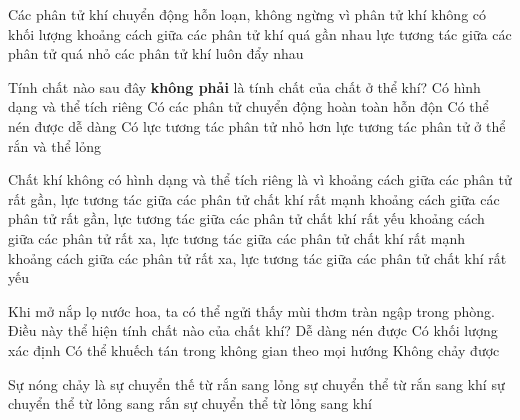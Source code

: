 \begin{ex} 
Các phân tử khí chuyển động hỗn loạn, không ngừng vì
\choice
{ phân tử khí không có khối lượng}
{ khoảng cách giữa các phân tử khí quá gần nhau}
{\True lực tương tác giữa các phân tử quá nhỏ}
{ các phân tử khí luôn đẩy nhau}
\end{ex}


\begin{ex}
Tính chất nào sau đây \textbf{không phải} là tính chất của chất ở thể khí?
\choice
{\True Có hình dạng và thể tích riêng}
{ Có các phân tử chuyển động hoàn toàn hỗn độn}
{ Có thể nén được dễ dàng}
{ Có lực tương tác phân tử nhỏ hơn lực tương tác phân tử ở thể rắn và thể lỏng}
\end{ex}


\begin{ex}
Chất khí không có hình dạng và thể tích riêng là vì
\choice
{ khoảng cách giữa các phân tử rất gần, lực tương tác giữa các phân tử chất khí rất mạnh}
{ khoảng cách giữa các phân tử rất gần, lực tương tác giữa các phân tử chất khí rất yếu}
{ khoảng cách giữa các phân tử rất xa, lực tương tác giữa các phân tử chất khí rất mạnh}
{\True khoảng cách giữa các phân tử rất xa, lực tương tác giữa các phân tử chất khí rất yếu}
\end{ex}


\begin{ex}
Khi mở nắp lọ nước hoa, ta có thể ngửi thấy mùi thơm tràn ngập trong phòng. Điều này thể hiện tính chất nào của chất khí?
\choice
{ Dễ dàng nén được}
{ Có khối lượng xác định}
{\True Có thể khuếch tán trong không gian theo mọi hướng}
{ Không chảy được}
\end{ex}


\begin{ex}
Sự nóng chảy là
\choice
{\True sự chuyển thế từ rắn sang lỏng}
{ sự chuyển thể từ rắn sang khí}
{ sự chuyển thể từ lỏng sang rắn}
{ sự chuyển thể từ lỏng sang khí}
\end{ex}


